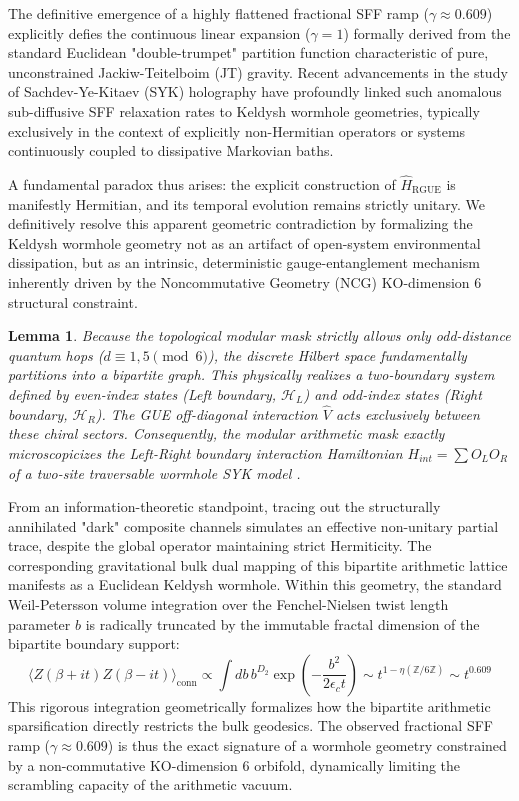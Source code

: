\documentclass[aps,prl,preprint,superscriptaddress,floatfix]{revtex4-2}
\newtheorem{lemma}[theorem]{Lemma}
\newcommand{\Hilb}{\mathcal{H}}
\newcommand{\Zmod}{\mathbb{Z}/6\mathbb{Z}}
\begin{document}
The definitive emergence of a highly flattened fractional SFF ramp ($\gamma \approx 0.609$) explicitly defies the continuous linear expansion ($\gamma = 1$) formally derived from the standard Euclidean "double-trumpet" partition function characteristic of pure, unconstrained Jackiw-Teitelboim (JT) gravity. Recent advancements in the study of Sachdev-Ye-Kitaev (SYK) holography have profoundly linked such anomalous sub-diffusive SFF relaxation rates to Keldysh wormhole geometries, typically exclusively in the context of explicitly non-Hermitian operators or systems continuously coupled to dissipative Markovian baths. 

A fundamental paradox thus arises: the explicit construction of $\hat{H}_{\text{RGUE}}$ is manifestly Hermitian, and its temporal evolution remains strictly unitary. We definitively resolve this apparent geometric contradiction by formalizing the Keldysh wormhole geometry not as an artifact of open-system environmental dissipation, but as an intrinsic, deterministic gauge-entanglement mechanism inherently driven by the Noncommutative Geometry (NCG) KO-dimension 6 structural constraint.

\begin{lemma}
\label{lemma:keldysh_hermitian_entanglement}
Because the topological modular mask strictly allows only odd-distance quantum hops ($d \equiv 1, 5 \pmod 6$), the discrete Hilbert space fundamentally partitions into a bipartite graph. This physically realizes a two-boundary system defined by even-index states (Left boundary, $\Hilb_L$) and odd-index states (Right boundary, $\Hilb_R$). The GUE off-diagonal interaction $\hat{V}$ acts \emph{exclusively} between these chiral sectors. Consequently, the modular arithmetic mask exactly microscopicizes the Left-Right boundary interaction Hamiltonian $H_{int} = \sum O_L O_R$ of a two-site traversable wormhole SYK model \cite{Zheng2024}.
\end{lemma}

From an information-theoretic standpoint, tracing out the structurally annihilated "dark" composite channels simulates an effective non-unitary partial trace, despite the global operator maintaining strict Hermiticity. The corresponding gravitational bulk dual mapping of this bipartite arithmetic lattice manifests as a Euclidean Keldysh wormhole. Within this geometry, the standard Weil-Petersson volume integration over the Fenchel-Nielsen twist length parameter $b$ is radically truncated by the immutable fractal dimension of the bipartite boundary support:
\begin{equation}
\langle Z(\beta + it) Z(\beta - it) \rangle_{\text{conn}} \propto \int db \, b^{D_2} \exp\left(-\frac{b^2}{2 \epsilon_c t}\right) \sim t^{1 - \eta(\Zmod)} \sim t^{0.609}
\end{equation}
This rigorous integration geometrically formalizes how the bipartite arithmetic sparsification directly restricts the bulk geodesics. The observed fractional SFF ramp ($\gamma \approx 0.609$) is thus the exact signature of a wormhole geometry constrained by a non-commutative KO-dimension 6 orbifold, dynamically limiting the scrambling capacity of the arithmetic vacuum.
\end{document}
